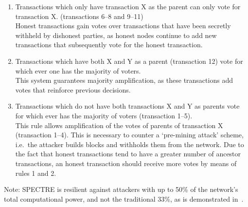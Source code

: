 \documentclass[a4paper,10pt,twocolumn]{article}
\begin{document}
 \vspace{-0.5\baselineskip}
 \begin{enumerate}
	 \setlength\itemsep{0em}
\item Transactions which only have transaction X as the parent can only vote for transaction X. (transactions 6--8 and 9--11) \\
Honest transactions gain votes over transactions that have been secretly withheld by dishonest parties, as honest nodes continue to add 
new transactions that subsequently vote for the honest transaction.
 \item Transactions which have both X and Y as a parent (transaction 12) vote for which ever one has the majority of voters. \\
This system guarantees majority amplification, as these transactions add votes that reinforce previous decisions. 
 \item  Transactions which do not have both transactions X and Y as parents vote for which ever has the majority of voters (transaction 
 1--5).\\
 This rule allows amplification of the votes of parents of transaction X (transaction 1--4). This is necessary to counter a `pre-mining 
 attack' scheme, i.e.\ the attacker builds blocks and withholds them from the network. Due to the fact that honest transactions tend to 
 have a greater number of ancestor transactions, an honest transaction should receive more votes by means of rules 1 and 2.
 \end{enumerate}

Note: SPECTRE is resilient against attackers with up to 50\% of the network's total computational power, and not the traditional 33\%, 
as is demonstrated in~\cite{spectre}.
\end{document}
